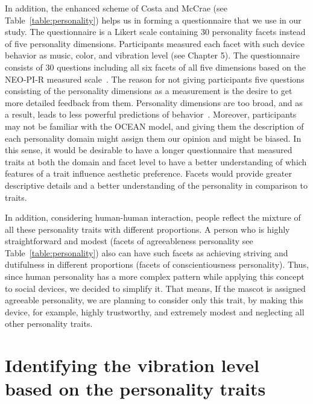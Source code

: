 In addition, the enhanced scheme of Costa and McCrae (see Table~\ref{table:personality})
helps us in forming a questionnaire that we use in our study.
The questionnaire is a Likert scale containing 30 personality facets instead of five personality dimensions.
Participants measured each facet with such device behavior as music, color, and vibration level (see Chapter 5).
The questionnaire consists of 30 questions including all six facets of
all five dimensions based on the NEO-PI-R measured scale~\cite{costa2008revised}.
The reason for not giving participants five questions consisting of the personality
dimensions as a measurement is the desire to get more detailed feedback from them.
Personality dimensions are too broad, and as a result, leads to less powerful predictions of behavior~\cite{paunonen2001big}.
Moreover, participants may not be familiar with the OCEAN model, and giving them the description
of each personality domain might assign them our opinion and might be biased.
In this sense, it would be desirable to have a longer questionnaire that measured traits at both the
domain and facet level to have a better understanding of which features of a trait influence aesthetic preference.
Facets would provide greater descriptive details and a better understanding of the personality in comparison to traits.

In addition, considering human-human interaction, people reflect the mixture of all
these personality traits with different proportions.
A person who is highly straightforward and modest (facets of agreeableness personality
see Table~\ref{table:personality}) also can have such facets as achieving striving and dutifulness
in different proportions (facets of conscientiousness personality).
Thus, since human personality has a more complex pattern while
applying this concept to social devices, we decided to simplify it.
That means, If the mascot is assigned agreeable personality, we are planning to consider only this trait,
by making this device, for example, highly trustworthy, and extremely modest and neglecting all other personality traits.

\section{Identifying the vibration level based on the personality traits} 
\label{sec:Identifying the vibration level based on the personality traits}

